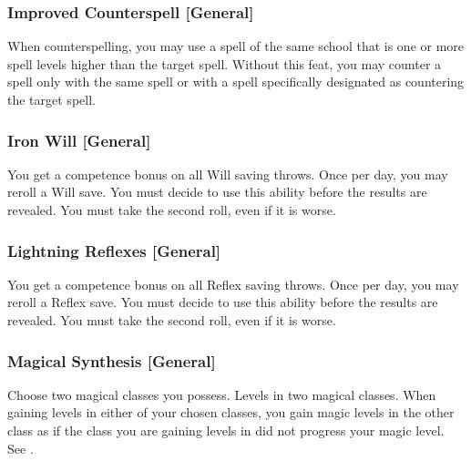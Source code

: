 
\subsubsection{Improved Counterspell [General]}
 When counterspelling, you may use a spell of the same school that is one or more spell levels higher than the target spell.
 Without this feat, you may counter a spell only with the same spell or with a spell specifically designated as countering the target spell.


\subsubsection{Iron Will [General]}
 You get a  competence bonus on all Will saving throws. Once per day, you may reroll a Will save. You must decide to use this ability before the results are revealed. You must take the second roll, even if it is worse.

\subsubsection{Lightning Reflexes [General]}
 You get a  competence bonus on all Reflex saving throws. Once per day, you may reroll a Reflex save. You must decide to use this ability before the results are revealed. You must take the second roll, even if it is worse.

\subsubsection{Magical Synthesis [General]}
Choose two magical classes you possess.
 Levels in two magical classes.
 When gaining levels in either of your chosen classes, you gain magic levels in the other class as if the class you are gaining levels in did not progress your magic level. See .

